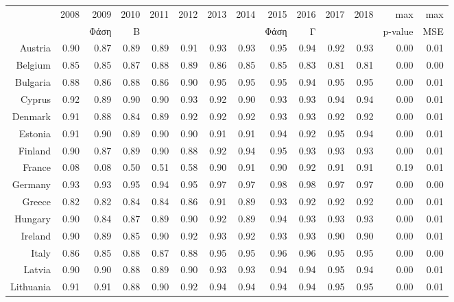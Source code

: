 \documentclass[a4paper,twoside,10pt]{article}
\begin{document}
	\begin{table}[H]
		\centering
		\tabcolsep=0.11cm
		\begin{tabular}{r|rrrrr|rrrrrr|rr}
			\hline
			& 2008 & 2009 & 2010 & 2011 & 2012 & 2013 & 2014 & 2015 & 2016 & 2017 & 2018 & max & max \\ 
			&  &  Φάση & Β &  &   &   &   & Φάση & Γ &  &  & p-value & MSE \\ 
			\hline
			Austria & 0.90 & 0.87 & 0.89 & 0.89 & 0.91 & 0.93 & 0.93 & 0.95 & 0.94 & 0.92 & 0.93 & 0.00 & 0.01 \\ 
			Belgium & 0.85 & 0.85 & 0.87 & 0.88 & 0.89 & 0.86 & 0.85 & 0.85 & 0.83 & 0.81 & 0.81 & 0.00 & 0.00 \\ 
			Bulgaria & 0.88 & 0.86 & 0.88 & 0.86 & 0.90 & 0.95 & 0.95 & 0.95 & 0.94 & 0.95 & 0.95 & 0.00 & 0.01 \\ 
			Cyprus & 0.92 & 0.89 & 0.90 & 0.90 & 0.93 & 0.92 & 0.90 & 0.93 & 0.93 & 0.94 & 0.94 & 0.00 & 0.01 \\ 
			Denmark & 0.91 & 0.88 & 0.84 & 0.89 & 0.92 & 0.92 & 0.92 & 0.93 & 0.93 & 0.92 & 0.92 & 0.00 & 0.01 \\ 
			\hline
			Estonia & 0.91 & 0.90 & 0.89 & 0.90 & 0.90 & 0.91 & 0.91 & 0.94 & 0.92 & 0.95 & 0.94 & 0.00 & 0.01 \\ 
			Finland & 0.90 & 0.87 & 0.89 & 0.90 & 0.88 & 0.92 & 0.94 & 0.95 & 0.93 & 0.93 & 0.93 & 0.00 & 0.01 \\ 
			\rowcolor{cyan} France & 0.08 & 0.08 & 0.50 & 0.51 & 0.58 & 0.90 & 0.91 & 0.90 & 0.92 & 0.91 & 0.91 & 0.19 & 0.01 \\ 
			Germany & 0.93 & 0.93 & 0.95 & 0.94 & 0.95 & 0.97 & 0.97 & 0.98 & 0.98 & 0.97 & 0.97 & 0.00 & 0.00 \\ 
			Greece & 0.82 & 0.82 & 0.84 & 0.84 & 0.86 & 0.91 & 0.89 & 0.93 & 0.92 & 0.92 & 0.92 & 0.00 & 0.01 \\ 
			\hline
			Hungary & 0.90 & 0.84 & 0.87 & 0.89 & 0.90 & 0.92 & 0.89 & 0.94 & 0.93 & 0.93 & 0.93 & 0.00 & 0.01 \\ 
			Ireland & 0.90 & 0.89 & 0.85 & 0.90 & 0.92 & 0.93 & 0.92 & 0.93 & 0.93 & 0.90 & 0.90 & 0.00 & 0.01 \\ 
			Italy & 0.86 & 0.85 & 0.88 & 0.87 & 0.88 & 0.95 & 0.95 & 0.96 & 0.96 & 0.95 & 0.95 & 0.00 & 0.00 \\ 
			Latvia & 0.90 & 0.90 & 0.88 & 0.89 & 0.90 & 0.93 & 0.93 & 0.94 & 0.94 & 0.95 & 0.94 & 0.00 & 0.01 \\ 
			Lithuania & 0.91 & 0.91 & 0.88 & 0.90 & 0.92 & 0.94 & 0.94 & 0.94 & 0.94 & 0.95 & 0.95 & 0.00 & 0.01 \\

\end{tabular}
\end{table}
\end{document}
